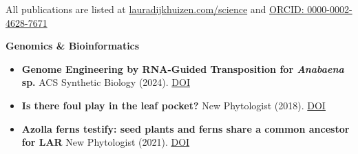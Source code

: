 \documentclass[a4paper,10pt]{article}
\begin{document}



All publications are listed at \href{https://lauradijkhuizen.com/science}{lauradijkhuizen.com/science}  and 
\textcolor[HTML]{A6CE39}{\faOrcid}\href{https://orcid.org/0000-0002-4628-7671}{ORCID: 0000-0002-4628-7671}

\textbf{Genomics \& Bioinformatics}
  \begin{itemize}
    \item \textbf{Genome Engineering by RNA-Guided Transposition for \textit{Anabaena} sp.}  
      ACS Synthetic Biology (2024). \href{https://doi.org/10.1021/acssynbio.3c00583}{DOI}
    \item \textbf{Is there foul play in the leaf pocket?}  
      New Phytologist (2018). \href{https://doi.org/10.1111/nph.14843}{DOI}
      \item \textbf{Azolla ferns testify: seed plants and ferns share a common ancestor for LAR}  
        New Phytologist (2021). \href{https://doi.org/10.1111/nph.16896}{DOI}
  \end{itemize}
\end{document}

